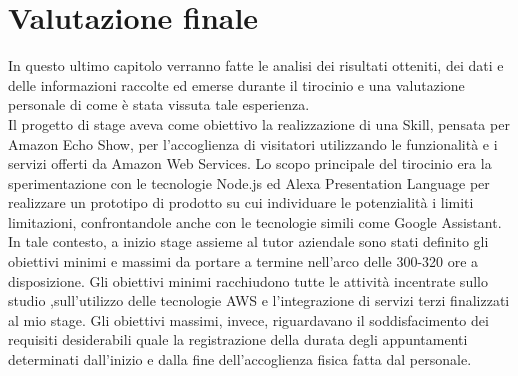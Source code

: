 
\chapter{Valutazione finale}
\label{cap:valutazione_finale}
In questo ultimo capitolo verranno fatte le analisi dei risultati otteniti, dei dati e delle informazioni raccolte ed emerse durante il tirocinio e una valutazione personale di come è stata vissuta tale esperienza.
\\[0.5cm]
Il progetto di stage aveva come obiettivo la realizzazione di una Skill, pensata per Amazon Echo Show, per l'accoglienza di visitatori utilizzando le funzionalità e i servizi offerti da Amazon Web Services.
Lo scopo principale del tirocinio era la sperimentazione con le tecnologie Node.js ed Alexa Presentation Language per realizzare un prototipo di prodotto su cui individuare le potenzialità i limiti limitazioni, confrontandole anche con le tecnologie simili come Google Assistant. In tale contesto, a inizio stage assieme al tutor aziendale sono stati definito gli obiettivi minimi e massimi da portare a termine nell'arco delle 300-320 ore a disposizione. Gli obiettivi minimi racchiudono tutte le attività incentrate sullo studio ,sull'utilizzo delle tecnologie AWS e l'integrazione di servizi terzi finalizzati al mio stage. Gli obiettivi massimi, invece, riguardavano il soddisfacimento dei requisiti desiderabili quale la registrazione della durata degli appuntamenti determinati dall'inizio e dalla fine dell'accoglienza fisica fatta dal personale.
